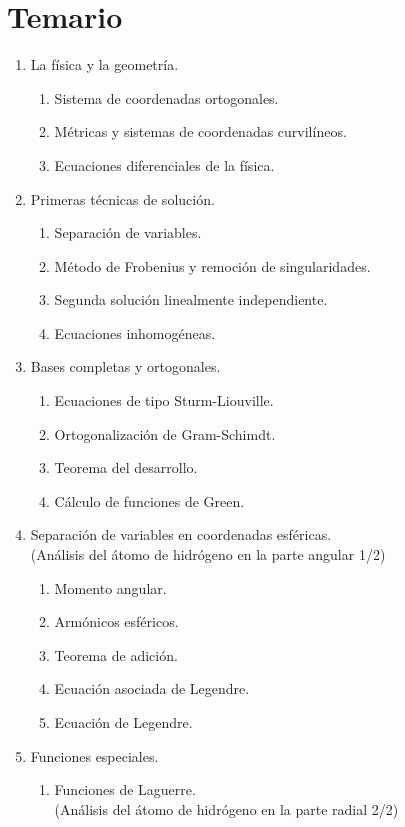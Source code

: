 \documentclass[12pt]{article}
\begin{document}
\section{Temario}
\begin{enumerate}
\item La física y la geometría.
\begin{enumerate}
\item Sistema de coordenadas ortogonales.
\item Métricas y sistemas de coordenadas curvilíneos.
\item Ecuaciones diferenciales de la física.
\end{enumerate}
\item Primeras técnicas de solución.
\begin{enumerate}
\item Separación de variables.
\item Método de Frobenius y remoción de singularidades.
\item Segunda solución linealmente independiente.
\item Ecuaciones inhomogéneas.
\end{enumerate}
\item Bases completas y ortogonales.
\begin{enumerate}
\item Ecuaciones de tipo Sturm-Liouville.
\item Ortogonalización de Gram-Schimdt.
\item Teorema del desarrollo.
\item Cálculo de funciones de Green.
\end{enumerate}
\item Separación de variables en coordenadas esféricas. \\ (Análisis del átomo de hidrógeno en la parte angular 1/2)
\begin{enumerate}
\item Momento angular.
\item Armónicos esféricos.
\item Teorema de adición.
\item Ecuación asociada de Legendre.
\item Ecuación de Legendre.
\end{enumerate}
\item Funciones especiales.
\begin{enumerate}
\item Funciones de Laguerre. \\ (Análisis del átomo de hidrógeno en la parte radial 2/2)

\end{enumerate}
\end{enumerate}
\end{document}
